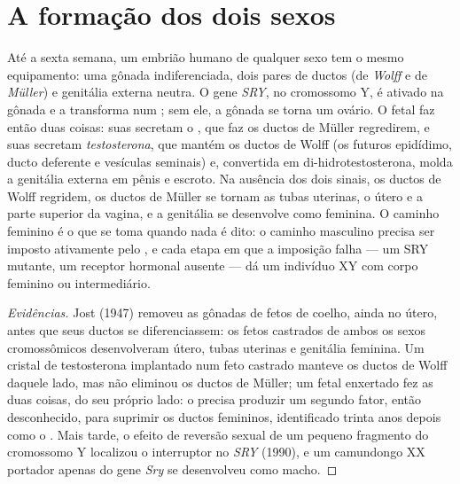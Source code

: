 \section{A formação dos dois sexos}

\begin{proposition}\label{prop:b2:mammal-reproduction:sex}
Até a sexta semana, um embrião humano de qualquer sexo tem o mesmo
equipamento: uma gônada indiferenciada, dois pares de ductos (de
\emph{Wolff} e de \emph{Müller}) e genitália externa neutra. O gene
\emph{SRY}, no cromossomo Y, é ativado na gônada e a transforma num
; sem ele, a gônada se torna um ovário. O  fetal faz
então duas coisas: suas  secretam o \emph{}, que faz os ductos de Müller regredirem, e suas
 secretam \emph{testosterona}, que mantém os ductos de
Wolff (os futuros epidídimo, ducto deferente e vesículas seminais) e,
convertida em di-hidrotestosterona, molda a genitália externa em pênis
e escroto. Na ausência dos dois sinais, os ductos de Wolff regridem, os
ductos de Müller se tornam as tubas uterinas, o útero e a parte
superior da vagina, e a genitália se desenvolve como feminina. O
caminho feminino é o que se toma quando nada é dito: o caminho
masculino precisa ser imposto ativamente pelo , e cada etapa
em que a imposição falha --- um SRY mutante, um receptor hormonal
ausente --- dá um indivíduo XY com corpo feminino ou intermediário.
\end{proposition}
\begin{proof}[Evidências]
Jost (1947) removeu as gônadas de fetos de coelho, ainda no útero,
antes que seus ductos se diferenciassem: os fetos castrados de ambos os
sexos cromossômicos desenvolveram útero, tubas uterinas e genitália
feminina. Um cristal de testosterona implantado num feto castrado
manteve os ductos de Wolff daquele lado, mas não eliminou os ductos de
Müller; um  fetal enxertado fez as duas coisas, do seu próprio
lado: o  precisa produzir um segundo fator, então
desconhecido, para suprimir os ductos femininos, identificado trinta
anos depois como o . Mais tarde, o efeito de
reversão sexual de um pequeno fragmento do cromossomo Y localizou o
interruptor no \emph{SRY} (1990), e um camundongo XX portador apenas do
gene \emph{Sry} se desenvolveu como macho.
\end{proof}

